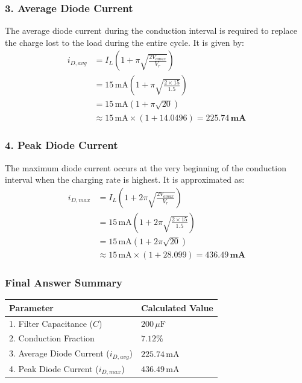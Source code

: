 \documentclass[12pt,a3paper]{article}
\begin{document}
\begin{enumerate}
\begin{tcolorbox}[enhanced,breakable,ansbox,colback=cA!4,colframe=cA,boxrule=0.8pt,arc=5pt,title={\textbf{Answer}},fonttitle=\bfseries\color{white},colbacktitle=cA]
\subsubsection*{3. Average Diode Current}
The average diode current during the conduction interval is required to replace the charge lost to the load during the entire cycle. It is given by:
\begin{align*}
    i_{D,avg} &= I_L \left( 1 + \pi \sqrt{\frac{2V_{omax}}{V_r}} \right) \\
    &= 15\,\text{mA} \left( 1 + \pi \sqrt{\frac{2 \times 15}{1.5}} \right) \\
    &= 15\,\text{mA} \left( 1 + \pi \sqrt{20} \right) \\
    &\approx 15\,\text{mA} \times (1 + 14.0496) = \mathbf{225.74\,\text{mA}}
\end{align*}

\subsubsection*{4. Peak Diode Current}
The maximum diode current occurs at the very beginning of the conduction interval when the charging rate is highest. It is approximated as:
\begin{align*}
    i_{D,max} &= I_L \left( 1 + 2\pi \sqrt{\frac{2V_{omax}}{V_r}} \right) \\
    &= 15\,\text{mA} \left( 1 + 2\pi \sqrt{\frac{2 \times 15}{1.5}} \right) \\
    &= 15\,\text{mA} \left( 1 + 2\pi \sqrt{20} \right) \\
    &\approx 15\,\text{mA} \times (1 + 28.099) = \mathbf{436.49\,\text{mA}}
\end{align*}

\vspace{0.5em}
\hrulefill
\vspace{0.5em}

\subsubsection*{Final Answer Summary}
\begin{center}
\renewcommand{\arraystretch}{1.5}
\begin{tabular}{@{}ll@{}}
    \toprule
    \textbf{Parameter} & \textbf{Calculated Value} \\
    \midrule
    1. Filter Capacitance ($C$) & $200\,\mu\text{F}$ \\
    2. Conduction Fraction & $7.12\%$ \\
    3. Average Diode Current ($i_{D,avg}$) & $225.74\,\text{mA}$ \\
    4. Peak Diode Current ($i_{D,max}$) & $436.49\,\text{mA}$ \\
    \bottomrule
\end{tabular}
\end{center}

\end{tcolorbox}

\end{enumerate}
\end{document}
